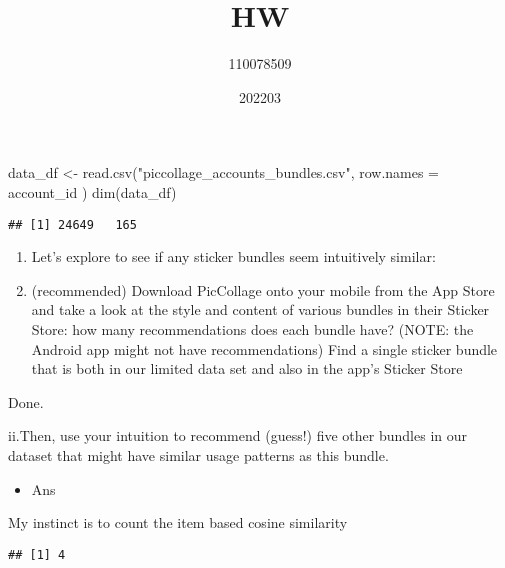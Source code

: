 \documentclass[
]{article}
\title{HW}
\author{110078509}
\date{202203}
\newenvironment{Shaded}{\begin{snugshade}}{\end{snugshade}}
\newcommand{\AttributeTok}[1]{\textcolor[rgb]{0.77,0.63,0.00}{#1}}
\newcommand{\FunctionTok}[1]{\textcolor[rgb]{0.00,0.00,0.00}{#1}}
\newcommand{\NormalTok}[1]{#1}
\newcommand{\OtherTok}[1]{\textcolor[rgb]{0.56,0.35,0.01}{#1}}
\newcommand{\SpecialCharTok}[1]{\textcolor[rgb]{0.00,0.00,0.00}{#1}}
\newcommand{\StringTok}[1]{\textcolor[rgb]{0.31,0.60,0.02}{#1}}
\providecommand{\tightlist}{%
  \setlength{\itemsep}{0pt}\setlength{\parskip}{0pt}}
\begin{document}
\maketitle

\begin{Shaded}
\begin{Highlighting}[]
\NormalTok{data\_df }\OtherTok{\textless{}{-}} \FunctionTok{read.csv}\NormalTok{(}\StringTok{"piccollage\_accounts\_bundles.csv"}\NormalTok{, }\AttributeTok{row.names =} \StringTok{\textquotesingle{}account\_id\textquotesingle{}}\NormalTok{ )}
\FunctionTok{dim}\NormalTok{(data\_df)}
\end{Highlighting}
\end{Shaded}

\begin{verbatim}
## [1] 24649   165
\end{verbatim}

\begin{enumerate}
\def\labelenumi{\alph{enumi}.}
\item
  Let's explore to see if any sticker bundles seem intuitively similar:
\item
  (recommended) Download PicCollage onto your mobile from the App Store
  and take a look at the style and content of various bundles in their
  Sticker Store: how many recommendations does each bundle have? (NOTE:
  the Android app might not have recommendations) Find a single sticker
  bundle that is both in our limited data set and also in the app's
  Sticker Store
\end{enumerate}

Done.

ii.Then, use your intuition to recommend (guess!) five other bundles in
our dataset that might have similar usage patterns as this bundle.

\begin{itemize}
\tightlist
\item
  Ans
\end{itemize}

My instinct is to count the item based cosine similarity

\begin{Shaded}
\end{Shaded}

\begin{verbatim}
## [1] 4
\end{verbatim}
\end{document}
